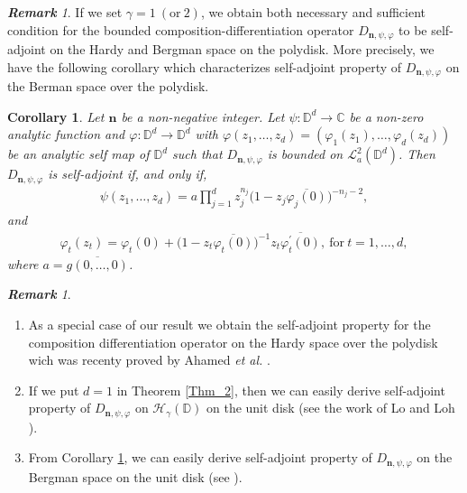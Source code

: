 \documentclass[12pt, reqno]{amsart}
\newtheorem{corollary}[theorem]{Corollary}
\theoremstyle{definition}
\theoremstyle{remark}
\newtheorem{remark}[theorem]{\bf{Remark}}
\numberwithin{equation}{section}
\newcommand{\mfn}{\mathbf n}
\begin{document}
 \begin{remark}
 	If we set $\gamma=1~(\mbox{or}~ 2)$, we obtain both necessary and sufficient condition for the bounded composition-differentiation operator $D_{\mfn,\psi,\varphi}$ to be self-adjoint on the Hardy and Bergman space on the polydisk. More precisely, we have the following corollary which characterizes self-adjoint property of $D_{\mfn,\psi,\varphi}$ on the Berman space over the polydisk.
 \end{remark}
 \begin{corollary}\label{Cor_2.8}
 	Let  $\mfn$ be a non-negative integer. Let $\psi: \mathbb{D}^d\longrightarrow \mathbb{C}$ be a non-zero analytic function and $\varphi: \mathbb{D}^d\longrightarrow \mathbb{D}^d$ with $\varphi(z_1,  \dots, z_d)=(\varphi_1(z_1), \dots, \varphi_d(z_d))$ be an analytic self map of $\mathbb{D}^d$ such that $D_{\mfn,\psi,\varphi}$ is bounded on $\mathcal{L}_a^2(\mathbb{D}^d)$.
 	Then $D_{\mfn,\psi,\varphi}$ is self-adjoint if, and only if,
 	\begin{gather*}
 	\psi(z_1, \dots, z_d)=a\prod_{j=1}^dz_j^{n_j}\big(1-z_j\overline{\varphi_j(0)}\big)^{-n_j-2},
 	\end{gather*}
 	and 
 	\begin{gather*}
 	\varphi_t(z_t)=\varphi_t(0)+\big(1-z_t\overline{\varphi_t(0)}\big)^{-1}z_t\overline{\varphi_t^{\prime}(0)},~ \mbox{for}~ t=1, \dots, d,
 	\end{gather*}
 	where $a=\overline{g(0, \dots, 0)}$.
 \end{corollary}
 \begin{remark}
 	\begin{enumerate}
 		\item[(i)] As a special case of our result we obtain the self-adjoint property for the composition differentiation operator on the Hardy space over the polydisk wich was recenty proved by Ahamed {\it et al.} \cite[Theorem 3.1]{Ahamed_Allu_Rahman_2023}.
 		\item[(ii)] If we put $d=1$ in Theorem \ref{Thm_2}, then we can easily derive self-adjoint property of $D_{\mfn,\psi,\varphi}$  on $\mathcal{H}_\gamma(\mathbb{D})$ on the unit disk (see the work of Lo and Loh \cite[Theorem 4.1]{Lo_Loh_JMAA_2023}).
 		\item[(iii)] From Corollary \ref{Cor_2.8}, we can easily derive self-adjoint property of $D_{\mfn,\psi,\varphi}$ on the Bergman space on the unit disk (see \cite[Theorem 2.4]{Allu_Haldar_Pal_2023}).
 	\end{enumerate} 	   
 \end{remark}
\end{document}
